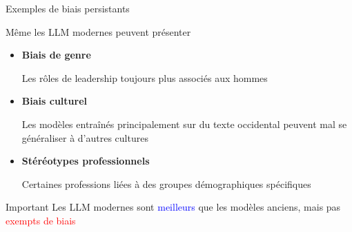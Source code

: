\begin{frame}{Exemples de biais persistants}

    \begin{block}{Même les LLM modernes peuvent présenter}
        \medskip
        \begin{itemize}
            \item<+-> \textbf{Biais de genre}

            Les rôles de leadership toujours plus associés aux hommes

            \item<+-> \textbf{Biais culturel}

            Les modèles entraînés principalement sur du texte occidental peuvent mal se généraliser à d'autres cultures

            \item<+-> \textbf{Stéréotypes professionnels}

            Certaines professions liées à des groupes démographiques spécifiques
        \end{itemize}
    \end{block}

    \bigskip

    \begin{overprint}
        \begin{alertblock}{Important}
            Les LLM modernes sont \textcolor{blue}{meilleurs} que les modèles anciens, mais pas \textcolor{red}{exempts de biais}
        \end{alertblock}
    \end{overprint}

\end{frame}


